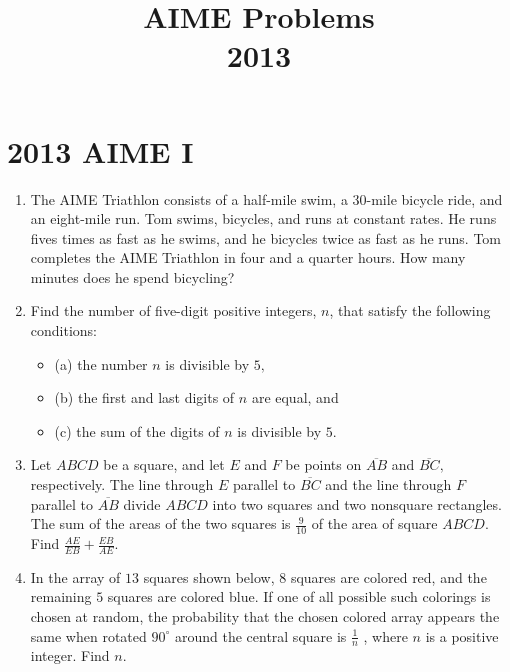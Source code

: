 \documentclass{article}
\title{AIME Problems \\ 2013}
\date{}
\begin{document}
\maketitle\thispagestyle{fancy}\newpage\section*{2013 AIME I}
\begin{enumerate}[label=\arabic*., itemsep=0.5em]
\item The AIME Triathlon consists of a half-mile swim, a 30-mile bicycle ride, and an eight-mile run. Tom swims, bicycles, and runs at constant rates. He runs fives times as fast as he swims, and he bicycles twice as fast as he runs. Tom completes the AIME Triathlon in four and a quarter hours. How many minutes does he spend bicycling?\par \vspace{0.5em}\item Find the number of five-digit positive integers, \(n\), that satisfy the following conditions:

\begin{itemize}
\item (a) the number \(n\) is divisible by \(5,\)
\end{itemize}


\begin{itemize}
\item (b) the first and last digits of \(n\) are equal, and
\end{itemize}


\begin{itemize}
\item (c) the sum of the digits of \(n\) is divisible by \(5.\)
\end{itemize}
\par \vspace{0.5em}\item Let \(ABCD\) be a square, and let \(E\) and \(F\) be points on \(\overline{AB}\) and \(\overline{BC},\) respectively. The line through \(E\) parallel to \(\overline{BC}\) and the line through \(F\) parallel to \(\overline{AB}\) divide \(ABCD\) into two squares and two nonsquare rectangles. The sum of the areas of the two squares is \(\frac{9}{10}\) of the area of square \(ABCD.\) Find \(\frac{AE}{EB} + \frac{EB}{AE}.\)\par \vspace{0.5em}\item In the array of \(13\) squares shown below, \(8\) squares are colored red, and the remaining \(5\) squares are colored blue. If one of all possible such colorings is chosen at random, the probability that the chosen colored array appears the same when rotated \(90^{\circ}\) around the central square is \(\frac{1}{n}\) , where \(n\) is a positive integer. Find \(n\).



\end{enumerate}
\end{document}
